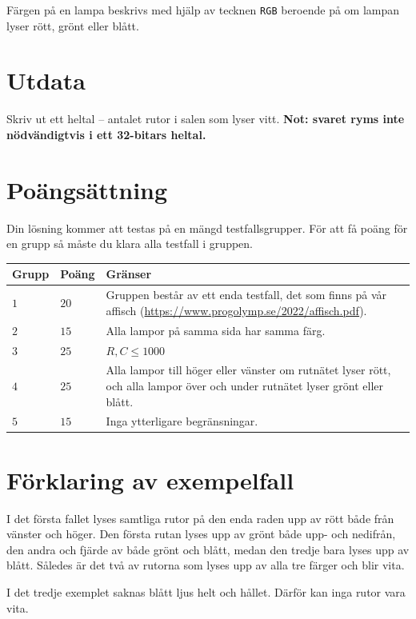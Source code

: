 Färgen på en lampa beskrivs med hjälp av tecknen \texttt{RGB} beroende på om lampan lyser rött, grönt eller blått.

\section*{Utdata}
Skriv ut ett heltal -- antalet rutor i salen som lyser vitt.
\textbf{Not: svaret ryms inte nödvändigtvis i ett 32-bitars heltal.}

\section*{Poängsättning}
Din lösning kommer att testas på en mängd testfallsgrupper.
För att få poäng för en grupp så måste du klara alla testfall i gruppen.

\noindent
\begin{tabular}{| l | l | p{12cm} |}
  \hline
  \textbf{Grupp} & \textbf{Poäng} & \textbf{Gränser} \\ \hline
  $1$    & $20$        &  Gruppen består av ett enda testfall, det som finns på vår affisch (\url{https://www.progolymp.se/2022/affisch.pdf}). \\ \hline 
  $2$    & $15$        &  Alla lampor på samma sida har samma färg. \\ \hline
  $3$    & $25$        &  $R,C \le 1000$ \\ \hline 
  $4$    & $25$        &  Alla lampor till höger eller vänster om rutnätet lyser rött, och alla lampor över och under rutnätet lyser grönt eller blått. \\ \hline
  $5$    & $15$        &  Inga ytterligare begränsningar. \\ \hline
\end{tabular}

\section*{Förklaring av exempelfall}
I det första fallet lyses samtliga rutor på den enda raden upp av rött både från vänster och höger.
Den första rutan lyses upp av grönt både upp- och nedifrån, den andra och fjärde av både grönt och blått, medan den tredje bara lyses upp av blått.
Således är det två av rutorna som lyses upp av alla tre färger och blir vita.

I det tredje exemplet saknas blått ljus helt och hållet.
Därför kan inga rutor vara vita.
